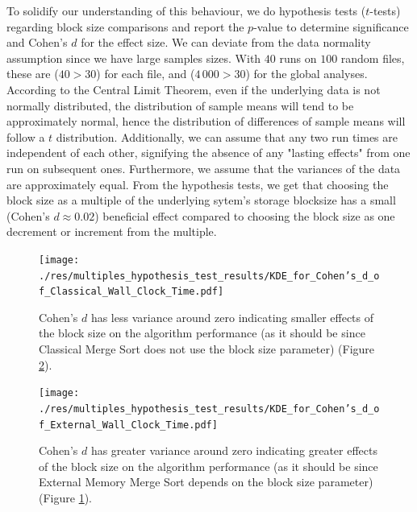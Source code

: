 \documentclass[twocolumn]{article}
\begin{document}
To solidify our understanding of this behaviour, we do hypothesis tests (\( t \)-tests) regarding block size comparisons and report the \( p \)-value to determine significance and Cohen's \( d \) for the effect size.
We can deviate from the data normality assumption since we have large samples sizes. 
With \( 40 \) runs on \( 100 \) random files, these are (\(40 > 30 \)) for each file, and (\(4\,000 > 30 \)) for the global analyses. 
According to the Central Limit Theorem, even if the underlying data is not normally distributed, the distribution of sample means will tend to be approximately normal, hence the
distribution of differences of sample means will follow a \( t \) distribution. 
Additionally, we can assume that any two run times are independent of each other, signifying the absence of any "lasting effects" from one run on subsequent ones.
Furthermore, we assume that the variances of the data are approximately equal. From the hypothesis tests, we get that choosing the block size as a multiple of the underlying sytem's storage blocksize
has a small (Cohen's \( d \approx 0.02 \)) beneficial effect compared to choosing the block size as one decrement or increment from the multiple.

\begin{figure}[htb]
	\begin{minipage}{0.475 \textwidth}
	\centering
	\texttt{[image: ./res/multiples\_hypothesis\_test\_results/KDE\_for\_Cohen's\_d\_of\_Classical\_Wall\_Clock\_Time.pdf]}
	\caption{Cohen's \(d\) has less variance around zero indicating smaller effects of the block size on the algorithm performance (as it should be since Classical Merge Sort does not use the block size parameter) 
	(Figure \ref{fig:KDE_for_Cohen's_d_of_External_Wall_Clock_Time.pdf}).}
	\label{fig:KDE_for_Cohen's_d_of_Classical_Wall_Clock_Time.pdf}
	\end{minipage}
\end{figure}

\begin{figure}[htb]
	\begin{minipage}{0.475 \textwidth}
	\centering
	\texttt{[image: ./res/multiples\_hypothesis\_test\_results/KDE\_for\_Cohen's\_d\_of\_External\_Wall\_Clock\_Time.pdf]}
	\caption{Cohen's \(d\) has greater variance around zero indicating greater effects of the block size on the algorithm performance (as it should be since
	External Memory Merge Sort depends on the block size parameter)
	(Figure \ref{fig:KDE_for_Cohen's_d_of_Classical_Wall_Clock_Time.pdf}).}
	\label{fig:KDE_for_Cohen's_d_of_External_Wall_Clock_Time.pdf}
	\end{minipage}
\end{figure}
\end{document}
